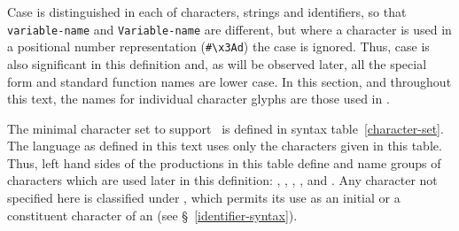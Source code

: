 \label{syntax}
%
\label{character-set}
%
\begin{optDefinition}
%
Case is distinguished in each of characters,
strings and identifiers, so that {\tt variable-name} and {\tt Variable-name} are
different, but where a character is used in a positional number representation
(\eg \verb+#\x3Ad+) the case is ignored.  Thus, case is also significant
in this definition and, as will be observed later, all the special form and
standard function names are lower case.  In this section, and throughout this
text, the names for individual character glyphs are those used in \cite{iso646}.

The minimal character set  to
support \eulisp\ is defined in syntax table~\ref{character-set}.  The language
as defined in this text uses only the characters given in this table.  Thus,
left hand sides of the productions in this table define and name groups of
characters which are used later in this definition: ,
, , ,
 and .  Any character not
specified here is classified under , which permits its
use as an initial or a constituent character of an  (see
\S~\ref{identifier-syntax}).
%
\Syntax
{}
%
\end{optDefinition}
